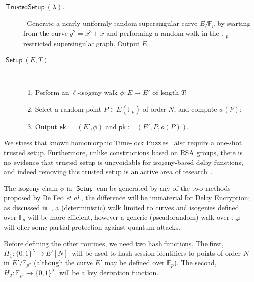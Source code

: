 \documentclass{llncs}
\newcommand{\F}{\mathbb{F}}
\DeclareMathOperator{\Setup}{\mathsf{Setup}}
\DeclareMathOperator{\TSetup}{\mathsf{TrustedSetup}}
\newcommand{\ek}{\mathsf{ek}}
\newcommand{\pk}{\mathsf{pk}}
\begin{document}
\begin{description}
\item[$\TSetup(\lambda)$.]\
  Generate a nearly uniformly random supersingular curve
  $E/\F_p$ by starting from the curve $y^2=x^3+x$ and performing a
  random walk in the $\F_p$-restricted supersingular graph. %
  Output $E$.
\item[$\Setup(E,T)$.]\
  \begin{enumerate}
  \item Perform an $\ell$-isogeny walk $\phi:E\to E'$ of length $T$;
  \item Select a random point $P\in E(\F_p)$ of order $N$, and compute
    $\phi(P)$;
  \item Output $\ek:=(E',\phi)$ and $\pk:=(E',P,\phi(P))$.
  \end{enumerate}
\end{description}

We stress that known homomorphic Time-lock Puzzles~\cite{C:MalThy19}
also require a one-shot trusted setup. %
Furthermore, unlike constructions based on RSA groups,
there is no evidence that trusted setup is unavoidable for
isogeny-based delay functions, and indeed removing this trusted setup
is an active area of
research~\cite{10.1007/978-3-030-45724-2_18,love2019supersingular}.

The isogeny chain $\phi$ in $\Setup$ can be generated by any of the
two methods proposed by De Feo \emph{et al.}, the difference will be
immaterial for Delay Encryption; as discussed
in~\cite{10.1007/978-3-030-34578-5_10}, a (deterministic) walk limited
to curves and isogenies defined over $\F_p$ will be more efficient,
however a generic (pseudorandom) walk over $\F_{p^2}$ will offer some
partial protection against quantum attacks.

Before defining the other routines, we need two hash functions. %
The first, $H_1:\{0,1\}^\lambda\to E'[N]$, will be used to hash session
identifiers to points of order $N$ in $E'/\F_{p^2}$ (although the
curve $E'$ may be defined over $\F_p$). %
The second, $H_2:\F_{p^2}\to\{0,1\}^\lambda$, will be a key derivation
function. %
\end{document}
